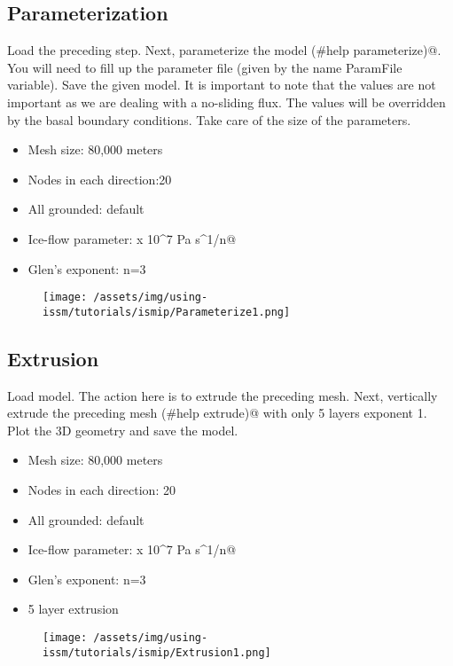 \subsection{Parameterization} %
Load the preceding step. Next, parameterize the model \verb@(#help parameterize)@. You will need to fill up the parameter file (given by the name ParamFile variable). Save the given model. It is important to note that the values are not important as we are dealing with a no-sliding flux. The values will be overridden by the basal boundary conditions. Take care of the size of the parameters.
\begin{itemize}
	\item Mesh size: 80,000 meters
	\item Nodes in each direction:20
	\item All grounded: default
	\item Ice-flow parameter:  x 10^7 Pa s^1/n@
	\item Glen's exponent: n=3
\end{itemize}
\begin{figure}[H]
	\begin{center}
		\texttt{[image: /assets/img/using-issm/tutorials/ismip/Parameterize1.png]}
	\end{center}
\end{figure}
\subsection{Extrusion} %
Load \verb@Parameterization@ model. The action here is to extrude the preceding mesh. Next, vertically
extrude the preceding mesh \verb@(#help extrude)@ with only 5 layers exponent 1. Plot the 3D
geometry and save the model.
\begin{itemize}
	\item Mesh size: 80,000 meters
	\item Nodes in each direction: 20
	\item All grounded: default
	\item Ice-flow parameter:  x 10^7 Pa s^1/n@
	\item Glen's exponent: n=3
	\item 5 layer extrusion
\end{itemize}
\begin{figure}[H]
	\begin{center}
		\texttt{[image: /assets/img/using-issm/tutorials/ismip/Extrusion1.png]}
	\end{center}
\end{figure}
